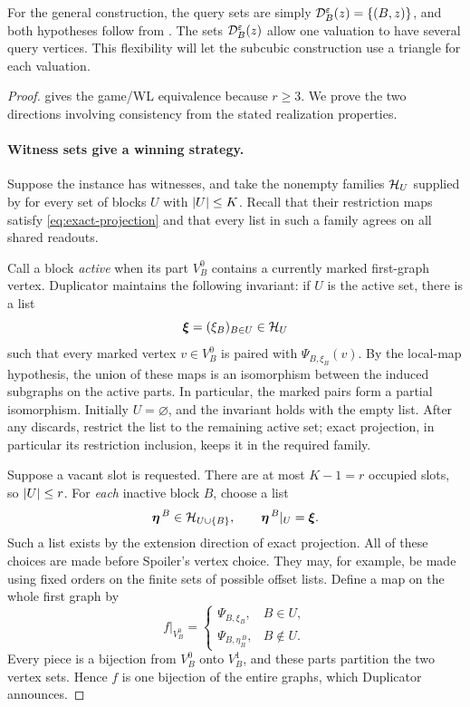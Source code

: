 For the general construction, the query sets are simply
\(\mathcal D_B^\varepsilon(z)=\{(B,z)\}\), and both hypotheses follow from
. The sets \(\mathcal D_B^\varepsilon(z)\)
allow one valuation to have several query vertices. This flexibility
will let the subcubic construction use a triangle for each valuation.

\begin{proof}
 gives the game/WL equivalence because \(r\ge3\).
We prove the two directions involving consistency from the stated
realization properties.

\paragraph{Witness sets give a winning strategy.}
Suppose the instance has witnesses, and take the nonempty families
$\mathcal H_U$ supplied by  for every set of blocks
$U$ with $\lvert U\rvert\leq K$.  Recall that their restriction maps satisfy
\eqref{eq:exact-projection} and that every list in such a family agrees on
all shared readouts.

Call a block \emph{active} when its part $V_B^0$ contains a currently
marked first-graph vertex.  Duplicator maintains the following invariant:
if $U$ is the active set, there is a list
\[
 \boldsymbol\xi=(\xi_B)_{B\in U}\in\mathcal H_U
\]
such that every marked vertex $v\in V_B^0$ is paired with
$\Psi_{B,\xi_B}(v)$.  By the local-map hypothesis, the union of these maps is an isomorphism
between the induced subgraphs on the active parts.  In particular, the marked pairs form a partial isomorphism.
Initially $U=\varnothing$, and the invariant holds with the empty list.
After any discards, restrict the list to the remaining active set; exact
projection, in particular its restriction inclusion, keeps it in the
required family.

Suppose a vacant slot is requested.  There are at most $K-1=r$ occupied
slots, so $\lvert U\rvert\leq r$.  For \emph{each} inactive block $B$, choose a
list
\begin{equation}
\label{uniform:preselected-extension}
 \boldsymbol\eta^{\,B}\in\mathcal H_{U\cup\{B\}},
 \qquad
 \boldsymbol\eta^{\,B}|_U=\boldsymbol\xi.
\end{equation}
Such a list exists by the extension direction of exact projection.
All of these choices are made before Spoiler's vertex choice.  They may,
for example, be made using fixed orders on the finite sets of possible
offset lists.  Define a map on the whole first graph by
\[
 f|_{V_B^0}=
 \begin{cases}
  \Psi_{B,\xi_B},&B\in U,\\
  \Psi_{B,\eta^{\,B}_B},&B\notin U.
 \end{cases}
\]
Every piece is a bijection from $V_B^0$ onto $V_B^1$, and these parts
partition the two vertex sets.  Hence $f$ is one bijection of the entire
graphs, which Duplicator announces.


\end{proof}
